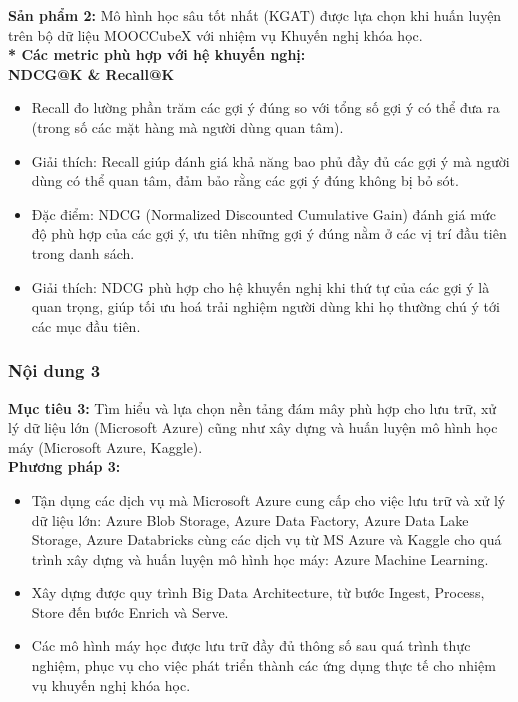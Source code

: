 \textbf{Sản phẩm 2:} Mô hình học sâu tốt nhất (KGAT) được lựa chọn khi huấn luyện trên bộ dữ liệu MOOCCubeX với nhiệm vụ Khuyến nghị khóa học.\\
\textbf{* Các metric phù hợp với hệ khuyến nghị:}\\
\textbf{NDCG@K \& Recall@K}
\begin{itemize}
    \item Recall đo lường phần trăm các gợi ý đúng so với tổng số gợi ý có thể đưa ra (trong số các mặt hàng mà người dùng quan tâm).
    \item Giải thích: Recall giúp đánh giá khả năng bao phủ đầy đủ các gợi ý mà người dùng có thể quan tâm, đảm bảo rằng các gợi ý đúng không bị bỏ sót.
\end{itemize}
\begin{itemize}
    \item Đặc điểm: NDCG (Normalized Discounted Cumulative Gain) đánh giá mức độ phù hợp của các gợi ý, ưu tiên những gợi ý đúng nằm ở các vị trí đầu tiên trong danh sách.
    \item Giải thích: NDCG phù hợp cho hệ khuyến nghị khi thứ tự của các gợi ý là quan trọng, giúp tối ưu hoá trải nghiệm người dùng khi họ thường chú ý tới các mục đầu tiên.
\end{itemize}
\subsubsection{Nội dung 3}
\textbf{Mục tiêu 3:} Tìm hiểu và lựa chọn nền tảng đám mây phù hợp cho lưu trữ, xử lý dữ liệu lớn (Microsoft Azure) cũng như xây dựng và huấn luyện mô hình học máy (Microsoft Azure, Kaggle).\\
\textbf{Phương pháp 3:}
\begin{itemize}
    \item Tận dụng các dịch vụ mà Microsoft Azure cung cấp cho việc lưu trữ và xử lý dữ liệu lớn: Azure Blob Storage, Azure Data Factory, Azure Data Lake Storage, Azure Databricks cùng các dịch vụ từ MS Azure và Kaggle cho quá trình xây dựng và huấn luyện mô hình học máy: Azure Machine Learning.
    \item Xây dựng được quy trình Big Data Architecture, từ bước Ingest, Process, Store đến bước Enrich và Serve.
    \item Các mô hình máy học được lưu trữ đầy đủ thông số sau quá trình thực nghiệm, phục vụ cho việc phát triển thành các ứng dụng thực tế cho nhiệm vụ khuyến nghị khóa học.
\end{itemize}

